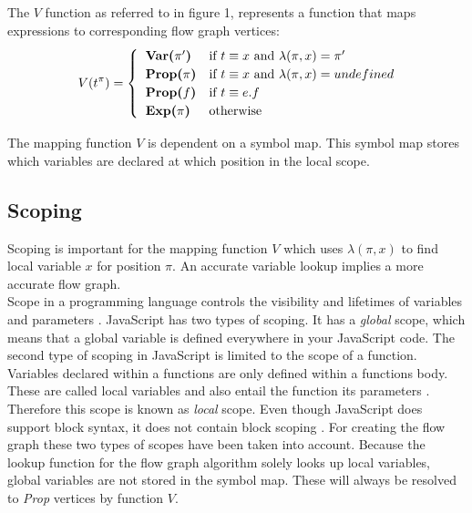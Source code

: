\documentclass[journal,10pt]{IEEEtran}
\begin{document}
The $V$ function as referred to in figure 1, represents a function that maps expressions to corresponding flow graph vertices:
\begin{equation*}
  V(t^\pi) = \begin{cases}
    \hspace*{0.2cm} \textbf{Var($\pi'$)} & \text{if~} t \equiv x \text{~and~} \lambda(\pi, x) = \pi' \\
    \hspace*{0.2cm} \textbf{Prop($\pi$)} & \text{if~} t \equiv x \text{~and~} \lambda(\pi, x) = undefined\\
    \hspace*{0.2cm} \textbf{Prop($f$)} & \text{if~} t \equiv e.f \\
    \hspace*{0.2cm} \textbf{Exp($\pi$)} &\text{otherwise}
  \end{cases}
\end{equation*}

The mapping function $V$ is dependent on a symbol map. This symbol map stores which variables are declared at which position in the local scope.

\subsection{Scoping}
Scoping is important for the mapping function $V$ which uses $\lambda(\pi, x)$ to find local variable $x$ for position $\pi$. An accurate variable lookup implies a more accurate flow graph. \\ %
Scope in a programming language controls the visibility and lifetimes of variables and parameters \cite[p.36]{Crockford:2008:JGP}. JavaScript has two types of scoping. It has a \textit{global} scope, which means that a global variable is defined everywhere in your JavaScript code. The second type of scoping in
JavaScript is limited to the scope of a function. Variables declared within a functions are only defined within a functions body. These are called local variables and also entail the function its parameters \cite[p.53]{flanagan2011javascript}. Therefore this scope is known as \textit{local} scope. Even though JavaScript does support block syntax, it does not contain block scoping \cite[p.36]{Crockford:2008:JGP}.
For creating the flow graph these two types of scopes have been taken into account. Because the lookup function for the flow graph algorithm solely looks up local variables, global variables are not stored in the symbol map. These will always be resolved to \textit{Prop} vertices by function $V$.
\end{document}
